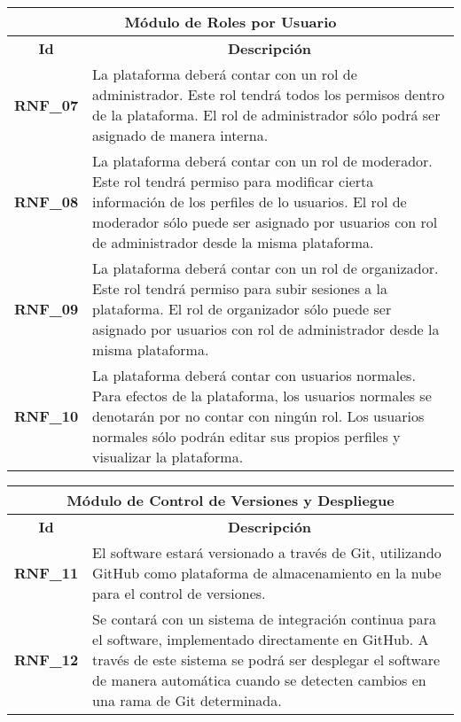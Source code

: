 \begin{center}
	\begin{tabular}{ | l | p{15cm} |}
		\hline
		\multicolumn{2}{|c|}{\textbf{Módulo de Roles por Usuario}} \\
		\hline
		\multicolumn{1}{|c|}{\textbf{Id}} & \multicolumn{1}{|c|}{\textbf{Descripción}} \\
		\hline
		{\textbf{RNF\_07}} & La plataforma deberá contar con un rol de administrador. Este rol tendrá todos los permisos dentro de la plataforma. El rol de administrador sólo podrá ser asignado de manera interna.\\ \hline
		
		{\textbf{RNF\_08}} & La plataforma deberá contar con un rol de moderador. Este rol tendrá permiso para modificar cierta información de los perfiles de lo usuarios. El rol de moderador sólo puede ser asignado por usuarios con rol de administrador desde  la misma plataforma.\\ \hline
		
		{\textbf{RNF\_09}} & La plataforma deberá contar con un rol de organizador. Este rol tendrá permiso para subir sesiones a la plataforma. El rol de organizador sólo puede ser asignado por usuarios con rol de administrador desde la misma plataforma. \\ \hline
		
		{\textbf{RNF\_10}} & La plataforma deberá contar con usuarios normales. Para efectos de la plataforma, los usuarios normales se denotarán por no contar con ningún rol. Los usuarios normales sólo podrán editar sus propios perfiles y visualizar la plataforma.\\ \hline
	\end{tabular}
\end{center}

\begin{center}
	\begin{tabular}{ | l | p{15cm} |}
		\hline
		\multicolumn{2}{|c|}{\textbf{Módulo de Control de Versiones y Despliegue}} \\
		\hline
		\multicolumn{1}{|c|}{\textbf{Id}} & \multicolumn{1}{|c|}{\textbf{Descripción}} \\
		\hline
		{\textbf{RNF\_11}} & El software estará versionado a través de Git, utilizando GitHub como plataforma de almacenamiento en la nube para el control de versiones.\\ \hline
		
		{\textbf{RNF\_12}} & Se contará con un sistema de integración continua para el software, implementado directamente en GitHub. A través de este sistema se podrá ser desplegar el software de manera automática cuando se detecten cambios en una rama de Git determinada.\\ \hline
	\end{tabular}
\end{center}

